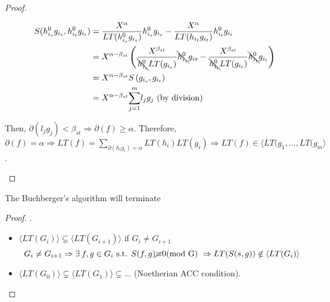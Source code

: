 \begin{theorem}
\begin{proof}
\begin{description} [leftmargin=0cm,labelindent=0cm]
\begin{equation}
\begin{split}
              S(h_{i_s}^0g_{i_s}, h_{i_t}^0g_{i_t}) &= \frac{X^\alpha}{LT(h_{i_s}^0g_{i_s})}h_{i_s}^0g_{i_s} - \frac{X^\alpha}{LT(h_{i_t}g_{i_t})}h_{i_t}^0g_{i_t} \\
              &= X^{\alpha-\beta_{st}} \left( \frac{X^{\beta_{st}}}{\bcancel{h_{i_s}^0}LT(g_{i_s})}\bcancel{h_{i_s}^0}g_{is} - \frac{X^{\beta_{st}}}{\bcancel{h_{i_t}^0}LT(g_{i_t})}\bcancel{h_{i_t}^0}g_{i_t}  \right) \\
              &= X^{\alpha-\beta_{st}} S\left(g_{i_s},g_{i_t}\right) \\
              &= X^{\alpha-\beta_{st}}\overset{m}{\underset{j = 1}{\sum}}{l_jg_j} \text{ (by division)}
            \end{split}
          \end{equation}
      \item Then, $\partial(l_jg_j) < \beta_{st} \Rightarrow \partial(f) \geq \alpha$. Therefore, $\partial(f) = \alpha \Rightarrow LT(f) = \underset{\partial(h_ig_i) = \alpha}{\sum}LT(h_i)LT(g_i) \Rightarrow LT(f) \in \langle LT(g_1,\dots, LT(g_m \rangle$.
 
    \end{description}
  \end{proof}
\end{theorem}

\begin{theorem}
  The Buchberger's algorithm will terminate
  \begin{proof}
    $.$
    \begin{itemize}
      \item $\langle LT(G_i) \rangle \subsetneq \langle LT(G_{i+1}) \rangle$ if $G_i \neq G_{i+1}$
        \[
          G_i \neq G_{i+1} \Rightarrow \exists f, g \in G_i \text{ s.t. } S(f,g) \cancel{\equiv} 0 \text{(mod G) } \Rightarrow LT(S(s,g)) \notin \langle LT(G_i) \rangle
        \]
      \item $\langle LT(G_0) \rangle \subsetneq \langle LT(G_1) \rangle \subsetneq \dots$ (Noetherian ACC condition).
    \end{itemize}
  \end{proof}
\end{theorem}

